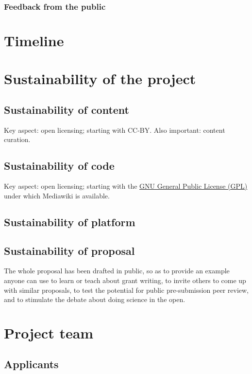 \documentclass[final,authoryear,3p]{elsarticle-open-drafting}
\begin{document}
\begin{enumerate}
\subsubsection{Feedback from the public}

\section{Timeline}

\section{Sustainability of the project}
\subsection{Sustainability of content}
Key aspect: open licensing; starting with CC-BY.
Also important: content curation.

\subsection{Sustainability of code}
Key aspect: open licensing; starting with the \href{http://www.gnu.org/licenses/gpl.html}{GNU General Public License (GPL)} under which Mediawiki is available.

\subsection{Sustainability of platform}
\subsection{Sustainability of proposal}
The whole proposal has been drafted in public, so as to provide an example anyone can use 
to learn or teach about grant writing, to invite others to come up with similar proposals, to test the potential for public pre-submission peer review, and to stimulate the debate about doing science in the open.

\section{Project team}
\subsection{Applicants}

\end{enumerate}
\end{document}
